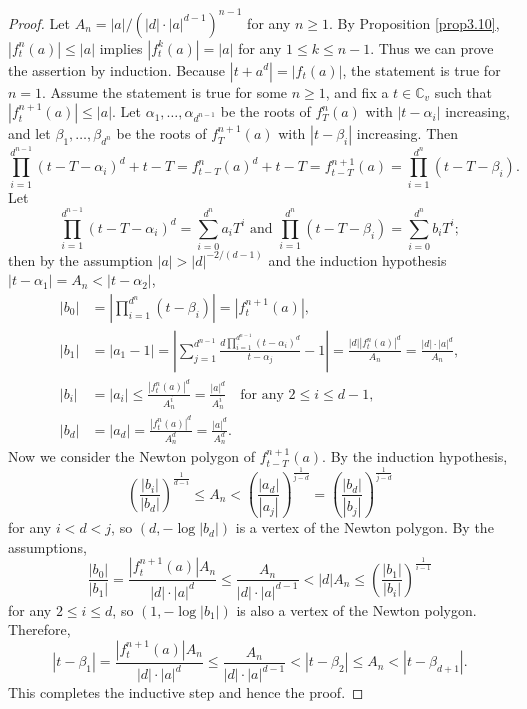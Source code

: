 \documentclass[10pt,a4paper]{amsart}
\numberwithin{equation}{section}
\theoremstyle{plain}
\theoremstyle{definition}
\theoremstyle{remark}
\newcommand{\C}{\mathbb C}
\begin{document}
\begin{proof}
Let $A_{n}=|a|/(|d|\cdot|a|^{d-1})^{n-1}$ for any $n\geq1$. By Proposition
\ref{prop3.10}, $|f_{t}^{n}(a)|\leq|a|$ implies $|f_{t}^{k}(a)|=|a|$
for any $1\leq k\leq n-1$. Thus we can prove the assertion by induction.
Because $|t+a^{d}|=|f_{t}(a)|$, the statement is true for $n=1$.
Assume the statement is true for some $n\geq1$, and fix a $t\in\C_{v}$
such that $|f_{t}^{n+1}(a)|\leq|a|$. Let $\alpha_{1},\dots,\alpha_{d^{n-1}}$
be the roots of $f_{T}^{n}(a)$ with $|t-\alpha_{i}|$ increasing,
and let $\beta_{1},\dots,\beta_{d^{n}}$ be the roots of $f_{T}^{n+1}(a)$
with $|t-\beta_{i}|$ increasing. Then
\[
\prod_{i=1}^{d^{n-1}}(t-T-\alpha_{i})^{d}+t-T=f_{t-T}^{n}(a)^{d}+t-T=f_{t-T}^{n+1}(a)=\prod_{i=1}^{d^{n}}(t-T-\beta_{i}).
\]
Let
\[
\prod_{i=1}^{d^{n-1}}(t-T-\alpha_{i})^{d}=\sum_{i=0}^{d^{n}}a_{i}T^{i}\text{ and }\prod_{i=1}^{d^{n}}(t-T-\beta_{i})=\sum_{i=0}^{d^{n}}b_{i}T^{i};
\]
then by the assumption $|a|>|d|^{-2/(d-1)}$ and the induction hypothesis
$|t-\alpha_{1}|=A_{n}<|t-\alpha_{2}|$,
\begin{align*}
|b_{0}| & =\left|\prod_{i=1}^{d^{n}}(t-\beta_{i})\right|=\left|f_{t}^{n+1}(a)\right|,\\
|b_{1}| & =|a_{1}-1|=\left|\sum_{j=1}^{d^{n-1}}\frac{d\prod_{i=1}^{d^{n-1}}(t-\alpha_{i})^{d}}{t-\alpha_{j}}-1\right|=\frac{|d|\left|f_{t}^{n}(a)\right|^{d}}{A_{n}}=\frac{|d|\cdot|a|^{d}}{A_{n}},\\
|b_{i}| & =|a_{i}|\leq\frac{\left|f_{t}^{n}(a)\right|^{d}}{A_{n}^{i}}=\frac{|a|^{d}}{A_{n}^{i}}\quad\text{for any }2\leq i\leq d-1,\\
|b_{d}| & =|a_{d}|=\frac{\left|f_{t}^{n}(a)\right|^{d}}{A_{n}^{d}}=\frac{|a|^{d}}{A_{n}^{d}}.
\end{align*}
Now we consider the Newton polygon of $f_{t-T}^{n+1}(a)$. By the
induction hypothesis,
\[
\left(\frac{|b_{i}|}{|b_{d}|}\right)^{\frac{1}{d-i}}\leq A_{n}<\left(\frac{|a_{d}|}{|a_{j}|}\right)^{\frac{1}{j-d}}=\left(\frac{|b_{d}|}{|b_{j}|}\right)^{\frac{1}{j-d}}
\]
for any $i<d<j$, so $(d,-\log|b_{d}|)$ is a vertex of the Newton
polygon. By the assumptions,
\[
\frac{|b_{0}|}{|b_{1}|}=\frac{\left|f_{t}^{n+1}(a)\right|A_{n}}{|d|\cdot|a|^{d}}\leq\frac{A_{n}}{|d|\cdot|a|^{d-1}}<|d|A_{n}\leq\left(\frac{|b_{1}|}{|b_{i}|}\right)^{\frac{1}{i-1}}
\]
for any $2\leq i\leq d$, so $(1,-\log|b_{1}|)$ is also a vertex
of the Newton polygon. Therefore,
\[
|t-\beta_{1}|=\frac{\left|f_{t}^{n+1}(a)\right|A_{n}}{|d|\cdot|a|^{d}}\leq\frac{A_{n}}{|d|\cdot|a|^{d-1}}<|t-\beta_{2}|\leq A_{n}<|t-\beta_{d+1}|.
\]
This completes the inductive step and hence the proof.
\end{proof}
\end{document}
